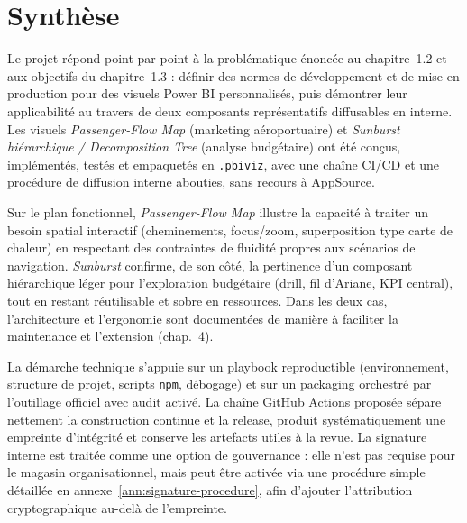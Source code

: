 
\section{Synthèse}
\label{sec:chap8-synthese}

Le projet répond point par point à la problématique énoncée au chapitre~1.2 et aux objectifs du chapitre~1.3 : définir des normes de développement et de mise en production pour des visuels Power BI personnalisés, puis démontrer leur applicabilité au travers de deux composants représentatifs diffusables en interne. Les visuels \textit{Passenger-Flow Map} (marketing aéroportuaire) et \textit{Sunburst hiérarchique / Decomposition Tree} (analyse budgétaire) ont été conçus, implémentés, testés et empaquetés en \texttt{.pbiviz}, avec une chaîne CI/CD et une procédure de diffusion interne abouties, sans recours à AppSource.

Sur le plan fonctionnel, \textit{Passenger-Flow Map} illustre la capacité à traiter un besoin spatial interactif (cheminements, focus/zoom, superposition type carte de chaleur) en respectant des contraintes de fluidité propres aux scénarios de navigation. \textit{Sunburst} confirme, de son côté, la pertinence d’un composant hiérarchique léger pour l’exploration budgétaire (drill, fil d’Ariane, KPI central), tout en restant réutilisable et sobre en ressources. Dans les deux cas, l’architecture et l’ergonomie sont documentées de manière à faciliter la maintenance et l’extension (chap.~4).

La démarche technique s’appuie sur un playbook reproductible (environnement, structure de projet, scripts \texttt{npm}, débogage) et sur un packaging orchestré par l’outillage officiel avec audit activé. La chaîne GitHub Actions proposée sépare nettement la construction continue et la release, produit systématiquement une empreinte d’intégrité et conserve les artefacts utiles à la revue. La signature interne est traitée comme une option de gouvernance : elle n’est pas requise pour le magasin organisationnel, mais peut être activée via une procédure simple détaillée en annexe~\ref{ann:signature-procedure}, afin d’ajouter l’attribution cryptographique au-delà de l’empreinte.

